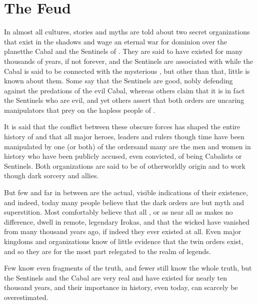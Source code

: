 \chapter{The Feud}
In almost all \Miithian{} cultures, stories and myths are told about two secret organizations that exist in the shadows and wage an eternal war for dominion over the planet\dash{}the Cabal and the Sentinels of \Miith{}. They are said to have existed for many thousands of years, if not forever, and the Sentinels are associated with \dragons{} while the Cabal is said to be connected with the mysterious \banes{}, but other than that, little is known about them. Some say that the Sentinels are good, nobly defending \Miith{} against the predations of the evil Cabal, whereas others claim that it is in fact the Sentinels who are evil, and yet others assert that both orders are uncaring manipulators that prey on the hapless people of \Miith{}. 

It is said that the conflict between these obscure forces has shaped the entire history of \Miith{} and that all major heroes, leaders and rulers though time have been manipulated by one (or both) of the orders\dash{}and many are the men and women in history who have been publicly accused, even convicted, of being Cabalists or Sentinels. Both organizations are said to be of otherworldly origin and to work though dark sorcery and \daemonic{} allies. 

But few and far in between are the actual, visible indications of their existence, and indeed, today many people believe that the dark orders are but myth and superstition. Most \Velcadians{} comfortably believe that all \dragons{}, or as near all as makes no difference, dwell in remote, legendary Irokas, and that the wicked \banes{} have vanished from \Miith{} many thousand years ago, if indeed they ever existed at all. Even major kingdoms and organizations know of little evidence that the twin orders exist, and so they are for the most part relegated to the realm of legends. 

Few know even fragments of the truth, and fewer still know the whole truth, but the Sentinels and the Cabal are very real and have existed for nearly ten thousand years, and their importance in \Miithian{} history, even today, can scarcely be overestimated. 















